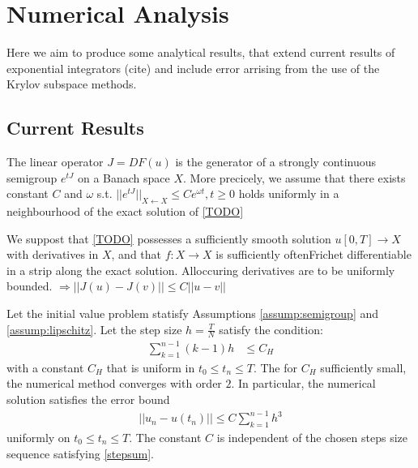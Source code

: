 \section{Numerical Analysis}

Here we aim to produce some analytical results, that extend current results of exponential integrators (cite) and include error arrising from the use of the Krylov subspace methods.

\subsection{Current Results}

\begin{assumption}\label{assump:semigroup}
    The linear operator $J = DF(u)$ is the generator of a strongly continuous semigroup $e^{tJ}$ on a Banach space $X$.
    More precicely, we assume that there exists constant $C$ and $\omega$ s.t. $||e^{tJ}||_{X \leftarrow X} \leq C e^{\omega t}, t \geq 0$
    holds uniformly in a neighbourhood of the exact solution of \ref{TODO}
\end{assumption}
\begin{assumption}\label{assump:lipschitz}
    We suppost that \ref{TODO} possesses a sufficiently smooth solution $u[0,T] \rightarrow X$ with derivatives in $X$,
    and that $f:X\rightarrow X$ is sufficiently oftenFrichet differentiable in a strip along the exact solution.
    Alloccuring derivatives are to be uniformly bounded.
    $\Rightarrow ||J(u) - J(v)|| \leq C||u-v||$
\end{assumption}

\begin{theorem}\label{theorem:standard}
    Let the initial value problem statisfy Assumptions \ref{assump:semigroup} and \ref{assump:lipschitz}.
    Let the step size $h = \frac TN$ satisfy the condition:
    \begin{align}
        \sum^{n-1}_{k=1}(k-1)h &\leq C_H \label{stepsum}
    \end{align}
    with a constant $C_H$ that is uniform in $t_0 \leq t_n \leq T$.
    The for $C_H$ sufficiently small, the numerical method converges with order $2$.
    In particular, the numerical solution satisfies the error bound
    \begin{align*}
        ||u_n-u(t_n)|| \leq C \sum^{n-1}_{k=1} h^3
    \end{align*}
    uniformly on $t_0 \leq t_n \leq T$.
    The constant $C$ is independent of the chosen steps size sequence satisfying \ref{stepsum}.
\end{theorem}


